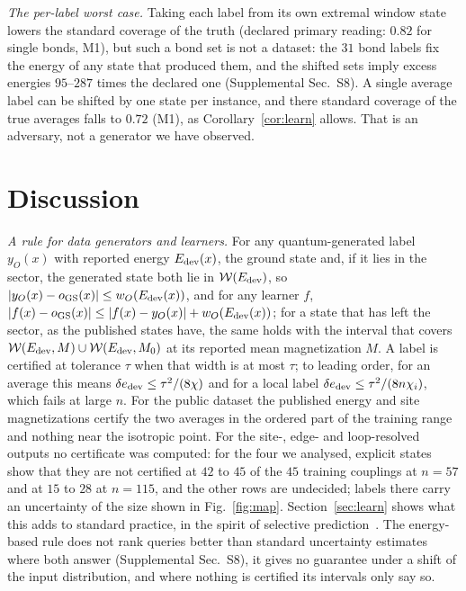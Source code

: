 \documentclass[aps,prx,twocolumn,10pt,superscriptaddress,nofootinbib,longbibliography,floatfix]{revtex4-2}
\theoremstyle{remark}
\newcommand{\de}{\delta e}
\newcommand{\W}{\mathcal{W}}
\newcommand{\GS}{\mathrm{GS}}
\begin{document}
\emph{The per-label worst case.} Taking each label from its own extremal window state lowers the standard coverage
of the truth (declared primary reading: $0.82$ for single bonds, M1), but such a bond set is not a dataset: the %
$31$ bond labels fix the energy of any state that produced them, and the shifted sets imply excess energies %
$95$--$287$ times the declared one (Supplemental Sec.~S8). A single average label can be shifted by one state per %
instance, and there standard coverage of the true averages falls to $0.72$ (M1), as Corollary~\ref{cor:learn} %
allows. That is an adversary, not a generator we have observed.

\section{Discussion}
\label{sec:discussion}

\emph{A rule for data generators and learners.} For any quantum-generated label $y_O(x)$ with reported energy
$E_{\rm dev}(x)$, the ground state and, if it lies in the sector, the generated state both lie in
$\W(E_{\rm dev})$, so $|y_O(x)-o_\GS(x)|\le w_O(E_{\rm dev}(x))$, and for any learner $f$,
$|f(x)-o_\GS(x)|\le|f(x)-y_O(x)|+w_O(E_{\rm dev}(x))$; for a state that has left the sector, as the published states
have, the same holds with the interval that covers $\W(E_{\rm dev},M)\cup\W(E_{\rm dev},M_0)$ at its reported mean
magnetization $M$. A label is certified at tolerance $\tau$ when that width is at most $\tau$; to leading order, for
an average this means $\de_{\rm dev}\le\tau^2/(8\chi)$ and for a local label
$\de_{\rm dev}\le\tau^2/(8n\chi_i)$, which fails at large $n$. For the public dataset the published energy and site
magnetizations certify the two averages in the ordered part of the training range and nothing near the isotropic
point. For the site-, edge- and loop-resolved outputs no certificate was computed: for the four we analysed,
explicit states show that they are not certified at $42$ to $45$ of the $45$ training couplings at $n=57$ and at %
$15$ to $28$ at $n=115$, and the other rows are undecided; %
labels there carry an uncertainty of the size shown in Fig.~\ref{fig:map}. Section~\ref{sec:learn} shows what this
adds to standard practice, in the spirit of selective prediction~\cite{chow1970,geifman2017,angelopoulos2021}. The
energy-based rule does not rank queries better than standard
uncertainty estimates where both answer (Supplemental Sec.~S8), it gives no guarantee under a shift of the input
distribution, and where nothing is certified its intervals only say so.
\end{document}
